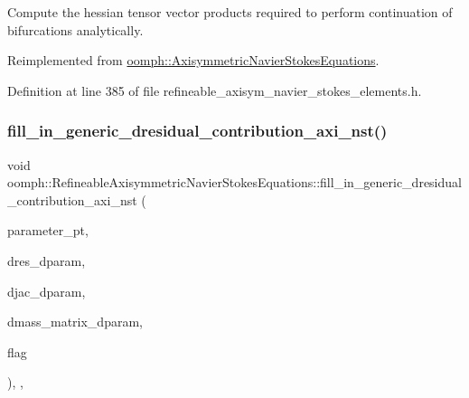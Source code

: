 Compute the hessian tensor vector products required to perform continuation of bifurcations analytically. 



Reimplemented from \hyperlink{classoomph_1_1AxisymmetricNavierStokesEquations_a295dab32c432e6f2597db7aa78c306d9}{oomph\+::\+Axisymmetric\+Navier\+Stokes\+Equations}.



Definition at line 385 of file refineable\+\_\+axisym\+\_\+navier\+\_\+stokes\+\_\+elements.\+h.

\mbox{\label{classoomph_1_1RefineableAxisymmetricNavierStokesEquations_a649f00dc4b0e086c90ebefb5c72ee481}} 
\subsubsection{\texorpdfstring{fill\+\_\+in\+\_\+generic\+\_\+dresidual\+\_\+contribution\+\_\+axi\+\_\+nst()}{fill\_in\_generic\_dresidual\_contribution\_axi\_nst()}}
{\footnotesize\ttfamily void oomph\+::\+Refineable\+Axisymmetric\+Navier\+Stokes\+Equations\+::fill\+\_\+in\+\_\+generic\+\_\+dresidual\+\_\+contribution\+\_\+axi\+\_\+nst (\begin{DoxyParamCaption}\item[{double $\ast$const \&}]{parameter\+\_\+pt,  }\item[{\hyperlink{classoomph_1_1Vector}{Vector}$<$ double $>$ \&}]{dres\+\_\+dparam,  }\item[{\hyperlink{classoomph_1_1DenseMatrix}{Dense\+Matrix}$<$ double $>$ \&}]{djac\+\_\+dparam,  }\item[{\hyperlink{classoomph_1_1DenseMatrix}{Dense\+Matrix}$<$ double $>$ \&}]{dmass\+\_\+matrix\+\_\+dparam,  }\item[{unsigned}]{flag }\end{DoxyParamCaption})\hspace{0.3cm}{\ttfamily [inline]}, {\ttfamily [private]}, {\ttfamily [virtual]}}



